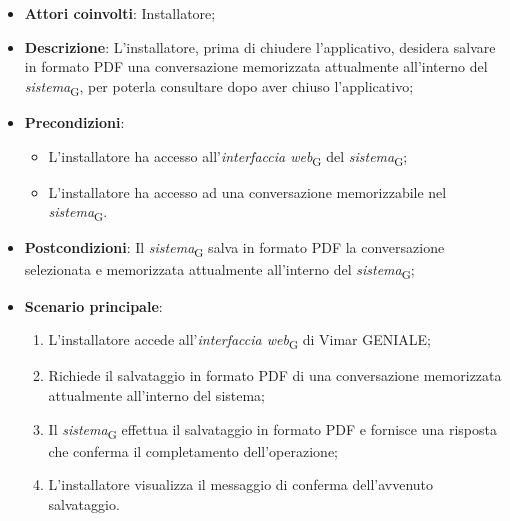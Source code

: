 \begin{itemize}
    \item \textbf{Attori coinvolti}: Installatore;
    \item \textbf{Descrizione}: L’installatore, prima di chiudere l’applicativo, desidera salvare in formato PDF una conversazione memorizzata attualmente all’interno del \textit{sistema}\textsubscript{G}, per poterla consultare dopo aver chiuso l'applicativo;
    \item \textbf{Precondizioni}: 
    \begin{itemize}
        \item L’installatore ha accesso all’\textit{interfaccia web}\textsubscript{G} del \textit{sistema}\textsubscript{G};
        \item L’installatore ha accesso ad una conversazione memorizzabile nel \textit{sistema}\textsubscript{G}.
    \end{itemize}
    \item \textbf{Postcondizioni}: Il \textit{sistema}\textsubscript{G} salva in formato PDF la conversazione selezionata e memorizzata attualmente all’interno del \textit{sistema}\textsubscript{G};
    \item \textbf{Scenario principale}:
    \begin{enumerate}
        \item L’installatore accede all’\textit{interfaccia web}\textsubscript{G} di Vimar GENIALE;
        \item Richiede il salvataggio in formato PDF di una conversazione memorizzata attualmente all'interno del sistema;
        \item Il \textit{sistema}\textsubscript{G} effettua il salvataggio in formato PDF e fornisce una risposta che conferma il completamento dell’operazione;
        \item L’installatore visualizza il messaggio di conferma dell’avvenuto salvataggio.
    \end{enumerate}
\end{itemize}

